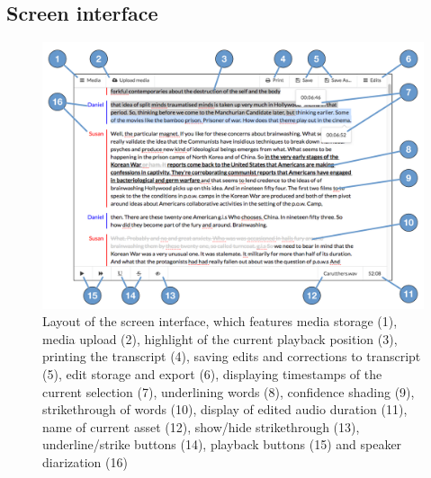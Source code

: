 


\subsection{Screen interface}\label{sec:paper-screen-design}

\begin{figure}[p]
  \centering
  \includegraphics[width=\columnwidth]{figs/discourse-interface-labelled.pdf}
  \caption{Layout of the screen interface, which features 
    media storage (1),
    media upload (2),
    highlight of the current playback position (3),
    printing the transcript (4),
    saving edits and corrections to transcript (5),
    edit storage and export (6),
    displaying timestamps of the current selection (7),
    underlining words (8),
    confidence shading (9),
    strikethrough of words (10),
    display of edited audio duration (11),
    name of current asset (12),
    show/hide strikethrough (13),
    underline/strike buttons (14),
    playback buttons (15)
  and speaker diarization (16)}
  \label{fig:dialogger-interface}
\end{figure}

